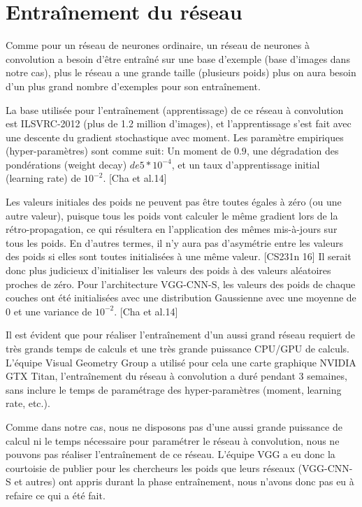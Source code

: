 \section{Entraînement du réseau}
	Comme pour un réseau de neurones ordinaire, un réseau de neurones à convolution a besoin d'être entraîné sur une base d'exemple (base d'images dans notre cas), plus le réseau a une grande taille (plusieurs poids) plus on aura besoin d'un plus grand nombre d'exemples pour son entraînement. 
	
	La base utilisée pour l’entraînement (apprentissage) de ce réseau à convolution est ILSVRC-2012 (plus de 1.2 million d'images), et l'apprentissage s'est fait avec une descente du gradient stochastique avec moment. Les paramètre empiriques (hyper-paramètres) sont comme suit: Un moment de $0.9$, une dégradation des pondérations (weight decay) $de 5*10^{-4}$, et un taux d'apprentissage initial (learning rate) de $10^{-2}$. [Cha et al.14]
	
	Les valeurs initiales des poids ne peuvent pas être toutes égales à zéro (ou une autre valeur), puisque tous les poids vont calculer le même gradient lors de la rétro-propagation, ce qui résultera en l'application des mêmes mis-à-jours sur tous les poids. En d'autres termes, il n'y aura pas d’asymétrie entre les valeurs des poids si elles sont toutes initialisées à une même valeur. [CS231n 16]	
	Il serait donc plus judicieux d'initialiser les valeurs des poids à des valeurs aléatoires proches de zéro. Pour l'architecture VGG-CNN-S, les valeurs des poids de chaque couches ont été initialisées avec une distribution Gaussienne avec une moyenne de 0 et une variance de $10^{-2}$. [Cha et al.14]
	
	Il est évident que pour réaliser l’entraînement d'un aussi grand réseau requiert de très grands temps de calculs et une très grande puissance CPU/GPU de calculs. L'équipe Visual Geometry Group a utilisé pour cela une carte graphique NVIDIA GTX Titan, l'entraînement du réseau à convolution a duré pendant 3 semaines, sans inclure le temps de paramétrage des hyper-paramètres (moment, learning rate, etc.).
	
	Comme dans notre cas, nous ne disposons pas d'une aussi grande puissance de calcul ni le temps nécessaire pour paramétrer le réseau à convolution, nous ne pouvons pas réaliser l’entraînement de ce réseau. L'équipe VGG a eu donc la courtoisie de publier pour les chercheurs les poids que leurs réseaux (VGG-CNN-S et autres) ont appris durant la phase entraînement, nous n'avons donc pas eu à refaire ce qui a été fait.


